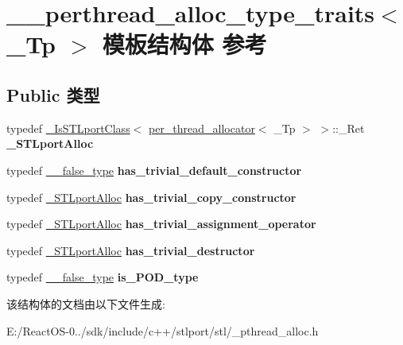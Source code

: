 \hypertarget{struct____perthread__alloc__type__traits}{}\section{\+\_\+\+\_\+perthread\+\_\+alloc\+\_\+type\+\_\+traits$<$ \+\_\+\+Tp $>$ 模板结构体 参考}
\label{struct____perthread__alloc__type__traits}
\subsection*{Public 类型}
\begin{DoxyCompactItemize}
\item 
\mbox{\label{struct____perthread__alloc__type__traits_ac189010fa4d706a16b5e8e39b3793c27}} 
typedef \hyperlink{struct___is_s_t_lport_class}{\+\_\+\+Is\+S\+T\+Lport\+Class}$<$ \hyperlink{classper__thread__allocator}{per\+\_\+thread\+\_\+allocator}$<$ \+\_\+\+Tp $>$ $>$\+::\+\_\+\+Ret {\bfseries \+\_\+\+S\+T\+Lport\+Alloc}
\item 
\mbox{\label{struct____perthread__alloc__type__traits_ae377d44869b0daf03891a251aec021a3}} 
typedef \hyperlink{struct____false__type}{\+\_\+\+\_\+false\+\_\+type} {\bfseries has\+\_\+trivial\+\_\+default\+\_\+constructor}
\item 
\mbox{\label{struct____perthread__alloc__type__traits_a90f24f8fe323d8550df7541e5424363b}} 
typedef \hyperlink{struct____true__type}{\+\_\+\+S\+T\+Lport\+Alloc} {\bfseries has\+\_\+trivial\+\_\+copy\+\_\+constructor}
\item 
\mbox{\label{struct____perthread__alloc__type__traits_a865e1df6735ac8c3c5932ffa0399e80e}} 
typedef \hyperlink{struct____true__type}{\+\_\+\+S\+T\+Lport\+Alloc} {\bfseries has\+\_\+trivial\+\_\+assignment\+\_\+operator}
\item 
\mbox{\label{struct____perthread__alloc__type__traits_a1195b9c3a4e1d9d0df76b70e8a0f6ee7}} 
typedef \hyperlink{struct____true__type}{\+\_\+\+S\+T\+Lport\+Alloc} {\bfseries has\+\_\+trivial\+\_\+destructor}
\item 
\mbox{\label{struct____perthread__alloc__type__traits_aaaf92b6d78997679a3e03864adb69329}} 
typedef \hyperlink{struct____false__type}{\+\_\+\+\_\+false\+\_\+type} {\bfseries is\+\_\+\+P\+O\+D\+\_\+type}
\end{DoxyCompactItemize}


该结构体的文档由以下文件生成\+:\begin{DoxyCompactItemize}
\item 
E\+:/\+React\+O\+S-\/0../sdk/include/c++/stlport/stl/\+\_\+pthread\+\_\+alloc.\+h\end{DoxyCompactItemize}
